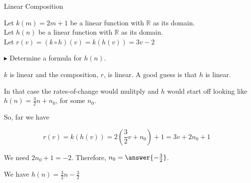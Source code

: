 \documentclass{ximera}
\begin{document}
\begin{example} Linear Composition

Let $k(m) = 2 m + 1$ be a linear function with $\mathbb{R}$ as its domain. \\
Let $h(n)$ be a linear function with $\mathbb{R}$ as its domain. \\


Let $r(v) = (k \circ h)(v) = k(h(v)) = 3 v - 2$ 

$\blacktriangleright$ Determine a formula for $h(n)$.





\begin{explanation}


$k$ is linear and the composition, $r$, is linear. A good guess is that $h$ is linear.  

In that case the rates-of-change would mulitply and $h$ would start off looking like $h(n) = \frac{3}{2} n + n_0$, for some $n_0$.


So, far we have 

\[   r(v) = k(h(v)) = 2 \left(\frac{3}{2} v + n_0\right) + 1  = 3v + 2 n_0 + 1\]


We need $2 n_0 + 1 = -2$.  Therefore, $n_0 = \answer{-\frac{3}{2}}$.


We have $h(n) = \frac{3}{2} n - \frac{3}{2}$


\end{explanation}
\end{example}
\end{document}
